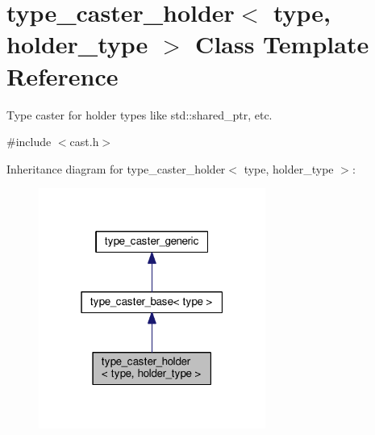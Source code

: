 \hypertarget{classtype__caster__holder}{}\section{type\+\_\+caster\+\_\+holder$<$ type, holder\+\_\+type $>$ Class Template Reference}
\label{classtype__caster__holder}


Type caster for holder types like std\+::shared\+\_\+ptr, etc.  




{\ttfamily \#include $<$cast.\+h$>$}



Inheritance diagram for type\+\_\+caster\+\_\+holder$<$ type, holder\+\_\+type $>$\+:
\nopagebreak
\begin{figure}[H]
\begin{center}
\leavevmode
\includegraphics[width=211pt]{classtype__caster__holder__inherit__graph}
\end{center}
\end{figure}


